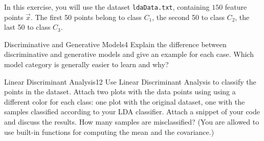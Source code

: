 \newif\ifvimbug
\vimbugfalse

\ifvimbug

\fi


In this exercise, you will use the dataset \texttt{ldaData.txt}, containing $150$ feature points $\vec x$. The first 50 points belong to class $C_1$, the second 50 to class $C_2$, the last 50 to class $C_3$.


\begin{questions}

\begin{question}{Discriminative and Generative Models}{4}
Explain the difference between discriminative and generative models and give an example for each case.
Which model category is generally easier to learn and why?
 
\begin{answer}\end{answer}

\end{question}


\begin{question}{Linear Discriminant Analysis}{12}
Use Linear Discriminant Analysis to classify the points in the dataset. Attach two plots with the data points using using a different color for each class: one plot with the original dataset, one with the samples classified according to your LDA classifier. Attach a snippet of your code and discuss the results. How many samples are misclassified? (You are allowed to use built-in functions for computing the mean and the covariance.)

\begin{answer}\end{answer}
\end{question}


\end{questions}
